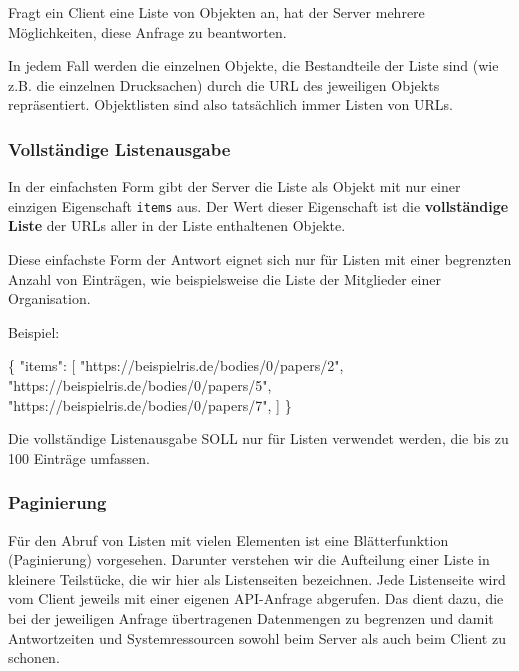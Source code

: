 \documentclass[,a4paper]{article}
\newenvironment{Shaded}{}{}
\newcommand{\DataTypeTok}[1]{\textcolor[rgb]{0.56,0.13,0.00}{{#1}}}
\newcommand{\StringTok}[1]{\textcolor[rgb]{0.25,0.44,0.63}{{#1}}}
\newcommand{\NormalTok}[1]{{#1}}
\begin{document}
Fragt ein Client eine Liste von Objekten an, hat der Server mehrere
Möglichkeiten, diese Anfrage zu beantworten.

In jedem Fall werden die einzelnen Objekte, die Bestandteile der Liste
sind (wie z.B. die einzelnen Drucksachen) durch die URL des jeweiligen
Objekts repräsentiert. Objektlisten sind also tatsächlich immer Listen
von URLs.

\subsubsection{Vollständige
Listenausgabe}\label{vollstuxe4ndige-listenausgabe}

In der einfachsten Form gibt der Server die Liste als Objekt mit nur
einer einzigen Eigenschaft \texttt{items} aus. Der Wert dieser
Eigenschaft ist die \textbf{vollständige Liste} der URLs aller in der
Liste enthaltenen Objekte.

Diese einfachste Form der Antwort eignet sich nur für Listen mit einer
begrenzten Anzahl von Einträgen, wie beispielsweise die Liste der
Mitglieder einer Organisation.

Beispiel:

\begin{Shaded}
\begin{Highlighting}[]
\NormalTok{\{}
    \DataTypeTok{"items"}\NormalTok{: [}
        \StringTok{"https://beispielris.de/bodies/0/papers/2"}\NormalTok{,}
        \StringTok{"https://beispielris.de/bodies/0/papers/5"}\NormalTok{,}
        \StringTok{"https://beispielris.de/bodies/0/papers/7"}\NormalTok{,}
    \NormalTok{]}
\NormalTok{\}}
\end{Highlighting}
\end{Shaded}

Die vollständige Listenausgabe SOLL nur für Listen verwendet werden, die
bis zu 100 Einträge umfassen.

\subsubsection{Paginierung}\label{paginierung}

Für den Abruf von Listen mit vielen Elementen ist eine Blätterfunktion
(Paginierung) vorgesehen. Darunter verstehen wir die Aufteilung einer
Liste in kleinere Teilstücke, die wir hier als Listenseiten bezeichnen.
Jede Listenseite wird vom Client jeweils mit einer eigenen API-Anfrage
abgerufen. Das dient dazu, die bei der jeweiligen Anfrage übertragenen
Datenmengen zu begrenzen und damit Antwortzeiten und Systemressourcen
sowohl beim Server als auch beim Client zu schonen.
\end{document}
